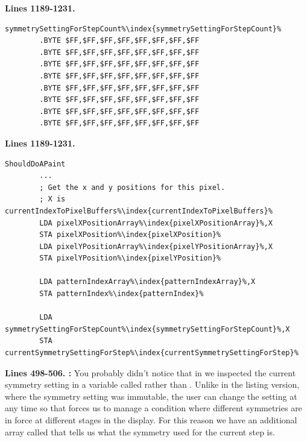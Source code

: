 \clearpage
\textbf{Lines 1189-1231. }
\begin{lstlisting}[escapechar=\%]
symmetrySettingForStepCount%\index{symmetrySettingForStepCount}%
        .BYTE $FF,$FF,$FF,$FF,$FF,$FF,$FF,$FF
        .BYTE $FF,$FF,$FF,$FF,$FF,$FF,$FF,$FF
        .BYTE $FF,$FF,$FF,$FF,$FF,$FF,$FF,$FF
        .BYTE $FF,$FF,$FF,$FF,$FF,$FF,$FF,$FF
        .BYTE $FF,$FF,$FF,$FF,$FF,$FF,$FF,$FF
        .BYTE $FF,$FF,$FF,$FF,$FF,$FF,$FF,$FF
        .BYTE $FF,$FF,$FF,$FF,$FF,$FF,$FF,$FF
        .BYTE $FF,$FF,$FF,$FF,$FF,$FF,$FF,$FF
\end{lstlisting}
\textbf{Lines 1189-1231. }
\begin{lstlisting}[escapechar=\%]
ShouldDoAPaint   
        ...
        ; Get the x and y positions for this pixel.
        ; X is currentIndexToPixelBuffers%\index{currentIndexToPixelBuffers}%
        LDA pixelXPositionArray%\index{pixelXPositionArray}%,X
        STA pixelXPosition%\index{pixelXPosition}%
        LDA pixelYPositionArray%\index{pixelYPositionArray}%,X
        STA pixelYPosition%\index{pixelYPosition}%

        LDA patternIndexArray%\index{patternIndexArray}%,X
        STA patternIndex%\index{patternIndex}%

        LDA symmetrySettingForStepCount%\index{symmetrySettingForStepCount}%,X
        STA currentSymmetrySettingForStep%\index{currentSymmetrySettingForStep}%
\end{lstlisting}
\clearpage

\textbf{Lines 498-506. :} You probably didn't notice that in 
we inspected the current symmetry setting in a variable called  rather than .
Unlike in the listing version, where the symmetry setting was immutable, the user can change the setting at any time so that forces us to
manage a condition where different symmetries are in force at different stages in the display. For this reason we have an additional array
called  that tells us what the symmetry used for the current step is.  

